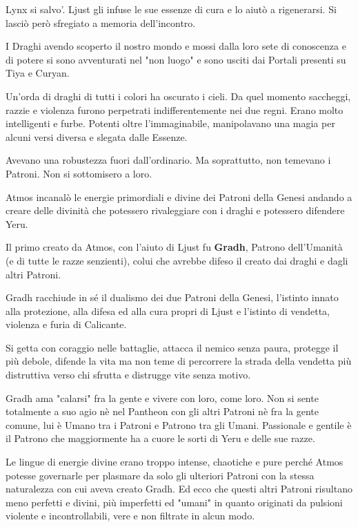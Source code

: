 \documentclass[a4paper,11pt,twoside,openany]{book}
\begin{document}
{Lynx si salvo'. Ljust gli infuse le sue essenze di cura e lo aiutò a rigenerarsi. Si lasciò però sfregiato a memoria dell'incontro.

I Draghi avendo scoperto il nostro mondo e mossi dalla loro sete di conoscenza e di potere si sono avventurati nel "non luogo" e sono usciti dai Portali presenti su Tiya e Curyan.

Un'orda di draghi di tutti i colori ha oscurato i cieli. Da quel momento saccheggi, razzie e violenza furono perpetrati indifferentemente nei due regni. Erano molto intelligenti e furbe. Potenti oltre l'immaginabile, manipolavano una magia per alcuni versi diversa e slegata dalle Essenze.

Avevano una robustezza fuori dall'ordinario. Ma soprattutto, non temevano i Patroni. Non si sottomisero a loro.

Atmos incanalò le energie primordiali e divine dei Patroni della Genesi andando a creare delle divinità che potessero rivaleggiare con i draghi e potessero difendere Yeru.

Il primo creato da Atmos, con l'aiuto di Ljust fu \textbf{Gradh}, Patrono dell'Umanità (e di tutte le razze senzienti), colui che avrebbe difeso il creato dai draghi e dagli altri Patroni.

Gradh racchiude in sé il dualismo dei due Patroni della Genesi, l'istinto innato alla protezione, alla difesa ed alla cura propri di Ljust e l'istinto di vendetta, violenza e furia di Calicante.

Si getta con coraggio nelle battaglie, attacca il nemico senza paura, protegge il più debole, difende la vita ma non teme di percorrere la strada della vendetta più distruttiva verso chi sfrutta e distrugge vite senza motivo.

Gradh ama "calarsi" fra la gente e vivere con loro, come loro. 
Non si sente totalmente a suo agio nè nel Pantheon con gli altri Patroni nè fra la gente comune, lui è Umano tra i Patroni e Patrono tra gli Umani. Passionale e gentile è il Patrono che maggiormente ha a cuore le sorti di Yeru e delle sue razze.

Le lingue di energie divine erano troppo intense, chaotiche e pure perché Atmos potesse governarle per plasmare da solo gli ulteriori Patroni con la stessa naturalezza con cui aveva creato Gradh. Ed ecco che questi altri Patroni risultano meno perfetti e divini, più imperfetti ed "umani" in quanto originati da pulsioni violente e incontrollabili, vere e non filtrate in alcun modo.

}
\end{document}
